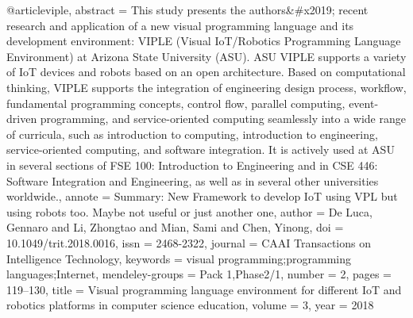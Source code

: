 @article{viple,
    abstract = {This study presents the authors{\&}{\#}x2019; recent research and application of a new visual programming language and its development environment: VIPLE (Visual IoT/Robotics Programming Language Environment) at Arizona State University (ASU). ASU VIPLE supports a variety of IoT devices and robots based on an open architecture. Based on computational thinking, VIPLE supports the integration of engineering design process, workflow, fundamental programming concepts, control flow, parallel computing, event-driven programming, and service-oriented computing seamlessly into a wide range of curricula, such as introduction to computing, introduction to engineering, service-oriented computing, and software integration. It is actively used at ASU in several sections of FSE 100: Introduction to Engineering and in CSE 446: Software Integration and Engineering, as well as in several other universities worldwide.},
    annote = {Summary: New Framework to develop IoT using VPL but using robots too.
    Maybe not useful or just another one},
    author = {{De Luca}, Gennaro and Li, Zhongtao and Mian, Sami and Chen, Yinong},
    doi = {10.1049/trit.2018.0016},
    issn = {2468-2322},
    journal = {CAAI Transactions on Intelligence Technology},
    keywords = {visual programming;programming languages;Internet},
    mendeley-groups = {Pack 1,Phase2/1},
    number = {2},
    pages = {119--130},
    title = {{Visual programming language environment for different IoT and robotics platforms in computer science education}},
    volume = {3},
    year = {2018}
}

